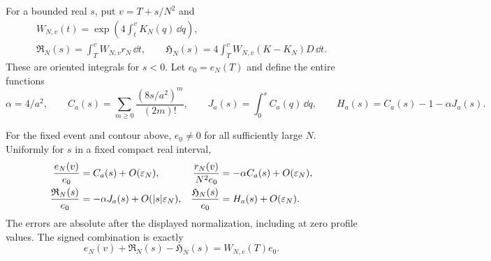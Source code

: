 For a bounded real \(s\), put \(v=T+s/N^2\) and
\[
 \begin{gathered}
 W_{N,v}(t)=\exp\!\left(4\int_t^v K_N(q)\,\dd q\right),\\
 \mathfrak R_N(s)=\int_T^v W_{N,v}r_N\,\dd t,\qquad
 \mathfrak H_N(s)=4\int_T^v W_{N,v}(K-K_N)D\,\dd t .
 \end{gathered}
\]
These are oriented integrals for \(s<0\). Let \(e_0=e_N(T)\) and
define the entire functions
\[
 \alpha=4/a^2,\qquad
 C_a(s)=\sum_{m\ge0}\frac{(8s/a^2)^m}{(2m)!},\qquad
 J_a(s)=\int_0^s C_a(q)\,\dd q,\qquad
 H_a(s)=C_a(s)-1-\alpha J_a(s).
\]

\begin{theorem}
\label{thm:gt-critical-profile}
For the fixed event and contour above, \(e_0\ne0\) for all
sufficiently large \(N\). Uniformly for \(s\) in a fixed compact
real interval,
\begin{align}
 \frac{e_N(v)}{e_0}&=C_a(s)+O(\varepsilon_N),&
 \frac{r_N(v)}{N^2e_0}&=-\alpha C_a(s)+O(\varepsilon_N),\notag\\
 \frac{\mathfrak R_N(s)}{e_0}&=-\alpha J_a(s)
                      +O(|s|\varepsilon_N),&
 \frac{\mathfrak H_N(s)}{e_0}&=H_a(s)+O(\varepsilon_N).
 \label{eq:gt-critical-profile}
\end{align}
The errors are absolute after the displayed normalization, including
at zero profile values. The signed combination is exactly
\begin{equation}
 e_N(v)+\mathfrak R_N(s)-\mathfrak H_N(s)=W_{N,v}(T)e_0 .
 \label{eq:gt-critical-combination}
\end{equation}
\end{theorem}
